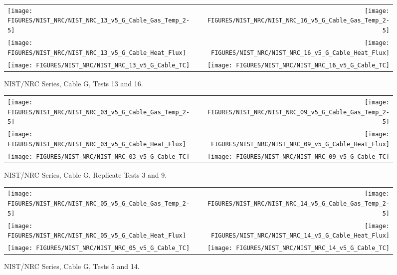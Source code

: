\begin{figure}[h]
\begin{tabular*}{\textwidth}{l@{\extracolsep{\fill}}r}
\texttt{[image: FIGURES/NIST\_NRC/NIST\_NRC\_13\_v5\_G\_Cable\_Gas\_Temp\_2-5]} &
\texttt{[image: FIGURES/NIST\_NRC/NIST\_NRC\_16\_v5\_G\_Cable\_Gas\_Temp\_2-5]} \\
\texttt{[image: FIGURES/NIST\_NRC/NIST\_NRC\_13\_v5\_G\_Cable\_Heat\_Flux]} &
\texttt{[image: FIGURES/NIST\_NRC/NIST\_NRC\_16\_v5\_G\_Cable\_Heat\_Flux]} \\
\texttt{[image: FIGURES/NIST\_NRC/NIST\_NRC\_13\_v5\_G\_Cable\_TC]} &
\texttt{[image: FIGURES/NIST\_NRC/NIST\_NRC\_16\_v5\_G\_Cable\_TC]}
\end{tabular*}
\caption{NIST/NRC Series, Cable G, Tests 13 and 16.}
\label{NIST_NRC_G_13_and_16}
\end{figure}

\begin{figure}[h]
\begin{tabular*}{\textwidth}{l@{\extracolsep{\fill}}r}
\texttt{[image: FIGURES/NIST\_NRC/NIST\_NRC\_03\_v5\_G\_Cable\_Gas\_Temp\_2-5]} &
\texttt{[image: FIGURES/NIST\_NRC/NIST\_NRC\_09\_v5\_G\_Cable\_Gas\_Temp\_2-5]} \\
\texttt{[image: FIGURES/NIST\_NRC/NIST\_NRC\_03\_v5\_G\_Cable\_Heat\_Flux]} &
\texttt{[image: FIGURES/NIST\_NRC/NIST\_NRC\_09\_v5\_G\_Cable\_Heat\_Flux]} \\
\texttt{[image: FIGURES/NIST\_NRC/NIST\_NRC\_03\_v5\_G\_Cable\_TC]} &
\texttt{[image: FIGURES/NIST\_NRC/NIST\_NRC\_09\_v5\_G\_Cable\_TC]}
\end{tabular*}
\caption{NIST/NRC Series, Cable G, Replicate Tests 3 and 9.}
\label{NIST_NRC_G_3_and_9}
\end{figure}

\begin{figure}[h]
\begin{tabular*}{\textwidth}{l@{\extracolsep{\fill}}r}
\texttt{[image: FIGURES/NIST\_NRC/NIST\_NRC\_05\_v5\_G\_Cable\_Gas\_Temp\_2-5]} &
\texttt{[image: FIGURES/NIST\_NRC/NIST\_NRC\_14\_v5\_G\_Cable\_Gas\_Temp\_2-5]} \\
\texttt{[image: FIGURES/NIST\_NRC/NIST\_NRC\_05\_v5\_G\_Cable\_Heat\_Flux]} &
\texttt{[image: FIGURES/NIST\_NRC/NIST\_NRC\_14\_v5\_G\_Cable\_Heat\_Flux]} \\
\texttt{[image: FIGURES/NIST\_NRC/NIST\_NRC\_05\_v5\_G\_Cable\_TC]} &
\texttt{[image: FIGURES/NIST\_NRC/NIST\_NRC\_14\_v5\_G\_Cable\_TC]}
\end{tabular*}
\caption{NIST/NRC Series, Cable G, Tests 5 and 14.}
\label{NIST_NRC_G_5_and_14}
\end{figure}

